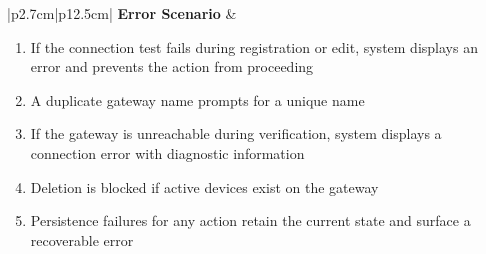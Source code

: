 \begin{table}[H]
\begin{tabular}{|p{2.7cm}|p{12.5cm}|}
        \hline
        \textbf{Error Scenario} & \begin{minipage}[t]{\linewidth}
            \begin{enumerate}[topsep=0pt,itemsep=1pt,parsep=0pt,partopsep=0pt]
                \item If the connection test fails during registration or edit, system displays an error and prevents the action from proceeding
                \item A duplicate gateway name prompts for a unique name
                \item If the gateway is unreachable during verification, system displays a connection error with diagnostic information
                \item Deletion is blocked if active devices exist on the gateway
                \item Persistence failures for any action retain the current state and surface a recoverable error
            \end{enumerate}
        \end{minipage} \\
        \hline
    \end{tabular}
    \label{tab:admin-manage-gateways}
\end{table}
